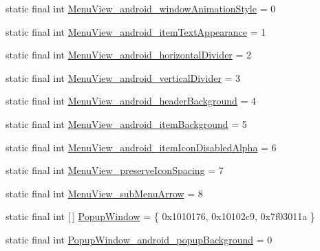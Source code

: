 \begin{DoxyCompactItemize}
\item 
static final int \mbox{\hyperlink{classandroid_1_1support_1_1v7_1_1appcompat_1_1_r_1_1styleable_abd54322c6ea26d63855ac5486725cb73}{Menu\+View\+\_\+android\+\_\+window\+Animation\+Style}} = 0
\item 
static final int \mbox{\hyperlink{classandroid_1_1support_1_1v7_1_1appcompat_1_1_r_1_1styleable_a13321c3d5c3fe41c38cdb5973b88c94f}{Menu\+View\+\_\+android\+\_\+item\+Text\+Appearance}} = 1
\item 
static final int \mbox{\hyperlink{classandroid_1_1support_1_1v7_1_1appcompat_1_1_r_1_1styleable_aec80c088fe2673b404870a06d5cda178}{Menu\+View\+\_\+android\+\_\+horizontal\+Divider}} = 2
\item 
static final int \mbox{\hyperlink{classandroid_1_1support_1_1v7_1_1appcompat_1_1_r_1_1styleable_a99d74a7d96d721513a733daa3bf135b0}{Menu\+View\+\_\+android\+\_\+vertical\+Divider}} = 3
\item 
static final int \mbox{\hyperlink{classandroid_1_1support_1_1v7_1_1appcompat_1_1_r_1_1styleable_a2461360be70faed4573a5a5d5119c2ae}{Menu\+View\+\_\+android\+\_\+header\+Background}} = 4
\item 
static final int \mbox{\hyperlink{classandroid_1_1support_1_1v7_1_1appcompat_1_1_r_1_1styleable_ac64d11fa342086310618c8e8a1c250fe}{Menu\+View\+\_\+android\+\_\+item\+Background}} = 5
\item 
static final int \mbox{\hyperlink{classandroid_1_1support_1_1v7_1_1appcompat_1_1_r_1_1styleable_a0fd3fcba8a2e911a9d2795f2beb7afa3}{Menu\+View\+\_\+android\+\_\+item\+Icon\+Disabled\+Alpha}} = 6
\item 
static final int \mbox{\hyperlink{classandroid_1_1support_1_1v7_1_1appcompat_1_1_r_1_1styleable_a075e9c8901b4738d9b5ed561e9c52615}{Menu\+View\+\_\+preserve\+Icon\+Spacing}} = 7
\item 
static final int \mbox{\hyperlink{classandroid_1_1support_1_1v7_1_1appcompat_1_1_r_1_1styleable_a31fd7dc1e15bd03702b78af27148af57}{Menu\+View\+\_\+sub\+Menu\+Arrow}} = 8
\item 
static final int \mbox{[}$\,$\mbox{]} \mbox{\hyperlink{classandroid_1_1support_1_1v7_1_1appcompat_1_1_r_1_1styleable_abfcd5394a28e12e51efa5ac509687b26}{Popup\+Window}} = \{ 0x1010176, 0x10102c9, 0x7f03011a \}
\item 
static final int \mbox{\hyperlink{classandroid_1_1support_1_1v7_1_1appcompat_1_1_r_1_1styleable_ac7f68e4984b94e3ebac98c9575349188}{Popup\+Window\+\_\+android\+\_\+popup\+Background}} = 0
\item 

\end{DoxyCompactItemize}
